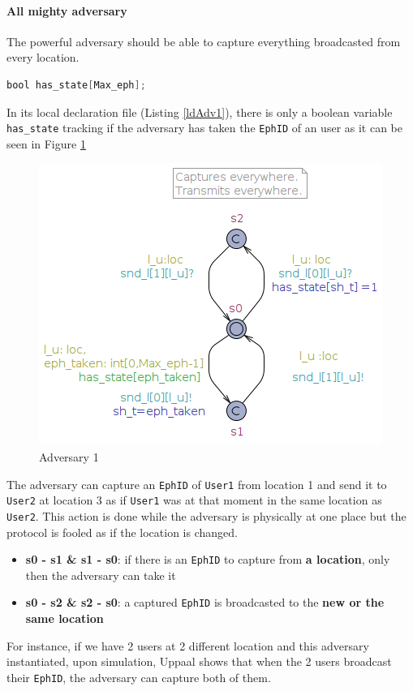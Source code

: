 \documentclass[a4paper, twocolumn]{article}
\begin{document}
\paragraph{All mighty adversary}
The powerful adversary should be able to capture everything broadcasted from every location. 
\begin{lstlisting}[language=C, caption= Adv1 Declarations,label={ldAdv1},xleftmargin=.02\textwidth]
bool has_state[Max_eph];
\end{lstlisting}
In its local declaration file (Listing \ref{ldAdv1}), there is only a boolean variable \texttt{has\_state} tracking if the adversary has taken the \texttt{EphID} of an user as it can be seen in Figure \ref{fig:adv1}
\begin{figure}[H]
    \centering
    \includegraphics[scale=0.4]{images/adv1.png}
    \caption{Adversary 1}
    \label{fig:adv1} 
\end{figure}
\noindent The adversary can capture an \texttt{EphID} of \texttt{User1} from location 1 and send it to \texttt{User2} at location 3 as if \texttt{User1} was at that moment in the same location as \texttt{User2}. This action is done while the adversary is physically at one place but the protocol is fooled as if the location is changed.
\begin{itemize}
    \item \textbf{s0 - s1 \& s1 - s0}: if there is an \texttt{EphID} to capture from \textbf{a location}, only then the adversary can take it
    \item \textbf{s0 - s2 \& s2 - s0}: a captured \texttt{EphID} is broadcasted to the \textbf{new or the same location} 
\end{itemize}
For instance, if we have 2 users at 2 different location and this adversary instantiated, upon simulation, Uppaal shows that when the 2 users broadcast their \texttt{EphID}, the adversary can capture both of them.
\end{document}
